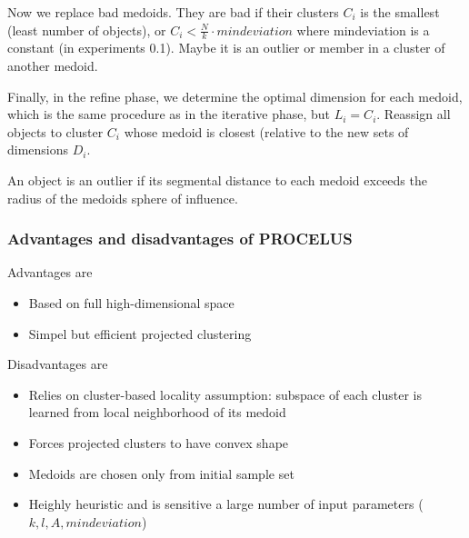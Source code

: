      Now we replace bad medoids. They are bad if their clusters $C_i$ is the smallest (least number of objects), or $C_i < \frac{N}{k} \cdot mindeviation$ where mindeviation is a constant (in experiments 0.1). Maybe it is an outlier or member in a cluster of another medoid. 
     
     Finally, in the refine phase, we determine the optimal dimension for each medoid, which is the same procedure as in the iterative phase, but $L_i = C_i$. Reassign all objects to cluster $C_i$ whose medoid is closest (relative to the new sets of dimensions $D_i$.
     
     An object is an outlier if its segmental distance to each medoid exceeds the radius of the medoids sphere of influence.
     
\subsubsection{Advantages and disadvantages of PROCELUS}
    Advantages are
    \begin{itemize}
        \item Based on full high-dimensional space
        \item Simpel but efficient projected clustering
    \end{itemize}
    Disadvantages are
    \begin{itemize}
        \item Relies on cluster-based locality assumption: subspace of each cluster is learned from local neighborhood of its medoid
        \item Forces projected clusters to have convex shape
        \item Medoids are chosen only from initial sample set
        \item Heighly heuristic and is sensitive a large number of input parameters ($k, l, A, mindeviation$)
    \end{itemize}
